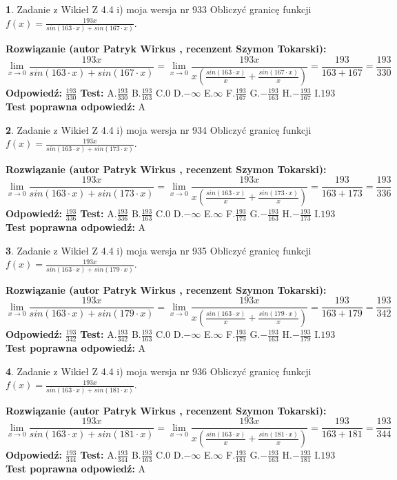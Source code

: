 \documentclass[12pt, a4paper]{article}
\theoremstyle{definition} %
\newtheorem{zad}{}
\newcommand{\zadStart}[1]{\begin{zad}#1\newline}
\newcommand{\zadStop}{\end{zad}}
\newcommand{\rozwStart}[2]{\noindent \textbf{Rozwiązanie (autor #1 , recenzent #2): }\newline}
\newcommand{\rozwStop}{\newline}
\newcommand{\odpStart}{\noindent \textbf{Odpowiedź:}\newline}
\newcommand{\odpStop}{\newline}
\newcommand{\testStart}{\noindent \textbf{Test:}\newline}
\newcommand{\testStop}{\newline}
\newcommand{\kluczStart}{\noindent \textbf{Test poprawna odpowiedź:}\newline}
\newcommand{\kluczStop}{\newline}
\begin{document}
\zadStart{Zadanie z Wikieł Z 4.4 i) moja wersja nr 933}
Obliczyć granicę funkcji $f(x)=\frac{193x}{sin(163\cdot x) +sin(167\cdot x)}$.
\zadStop
\rozwStart{Patryk Wirkus}{Szymon Tokarski}
$$\lim\limits_{x\to 0}\frac{193x}{sin(163\cdot x) +sin(167\cdot x)}=\lim\limits_{x\to 0}\frac{193x}{x(\frac{sin(163\cdot x)}{x}+\frac{sin(167\cdot x)}{x})}=\frac{193}{163+167} = \frac{193}{330}$$
\rozwStop
\odpStart
$\frac{193}{330}$
\odpStop
\testStart
A.$\frac{193}{330}$
B.$\frac{193}{163}$
C.$0$
D.$-\infty$
E.$\infty$
F.$\frac{193}{167}$
G.$-\frac{193}{163}$
H.$-\frac{193}{167}$
I.$193$
\testStop
\kluczStart
A
\kluczStop



\zadStart{Zadanie z Wikieł Z 4.4 i) moja wersja nr 934}
Obliczyć granicę funkcji $f(x)=\frac{193x}{sin(163\cdot x) +sin(173\cdot x)}$.
\zadStop
\rozwStart{Patryk Wirkus}{Szymon Tokarski}
$$\lim\limits_{x\to 0}\frac{193x}{sin(163\cdot x) +sin(173\cdot x)}=\lim\limits_{x\to 0}\frac{193x}{x(\frac{sin(163\cdot x)}{x}+\frac{sin(173\cdot x)}{x})}=\frac{193}{163+173} = \frac{193}{336}$$
\rozwStop
\odpStart
$\frac{193}{336}$
\odpStop
\testStart
A.$\frac{193}{336}$
B.$\frac{193}{163}$
C.$0$
D.$-\infty$
E.$\infty$
F.$\frac{193}{173}$
G.$-\frac{193}{163}$
H.$-\frac{193}{173}$
I.$193$
\testStop
\kluczStart
A
\kluczStop



\zadStart{Zadanie z Wikieł Z 4.4 i) moja wersja nr 935}
Obliczyć granicę funkcji $f(x)=\frac{193x}{sin(163\cdot x) +sin(179\cdot x)}$.
\zadStop
\rozwStart{Patryk Wirkus}{Szymon Tokarski}
$$\lim\limits_{x\to 0}\frac{193x}{sin(163\cdot x) +sin(179\cdot x)}=\lim\limits_{x\to 0}\frac{193x}{x(\frac{sin(163\cdot x)}{x}+\frac{sin(179\cdot x)}{x})}=\frac{193}{163+179} = \frac{193}{342}$$
\rozwStop
\odpStart
$\frac{193}{342}$
\odpStop
\testStart
A.$\frac{193}{342}$
B.$\frac{193}{163}$
C.$0$
D.$-\infty$
E.$\infty$
F.$\frac{193}{179}$
G.$-\frac{193}{163}$
H.$-\frac{193}{179}$
I.$193$
\testStop
\kluczStart
A
\kluczStop



\zadStart{Zadanie z Wikieł Z 4.4 i) moja wersja nr 936}
Obliczyć granicę funkcji $f(x)=\frac{193x}{sin(163\cdot x) +sin(181\cdot x)}$.
\zadStop
\rozwStart{Patryk Wirkus}{Szymon Tokarski}
$$\lim\limits_{x\to 0}\frac{193x}{sin(163\cdot x) +sin(181\cdot x)}=\lim\limits_{x\to 0}\frac{193x}{x(\frac{sin(163\cdot x)}{x}+\frac{sin(181\cdot x)}{x})}=\frac{193}{163+181} = \frac{193}{344}$$
\rozwStop
\odpStart
$\frac{193}{344}$
\odpStop
\testStart
A.$\frac{193}{344}$
B.$\frac{193}{163}$
C.$0$
D.$-\infty$
E.$\infty$
F.$\frac{193}{181}$
G.$-\frac{193}{163}$
H.$-\frac{193}{181}$
I.$193$
\testStop
\kluczStart
A
\kluczStop
\end{document}
